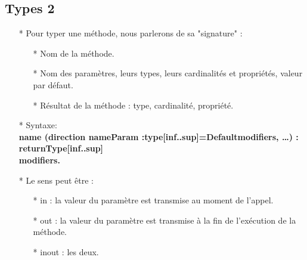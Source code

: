 \documentclass[12pt]{article}
\begin{document}
\subsection{Types 2}
\begin{itemize}
	\item[* ] Pour typer une méthode, nous parlerons de sa "signature" :
	\begin{itemize}
		\item[* ] Nom de la méthode.
		\item[* ] Nom des paramètres, leurs types, leurs cardinalités et propriétés, valeur par défaut.
		\item[* ] Résultat de la méthode : type, cardinalité, propriété.
	\end{itemize}
\item[* ] Syntaxe:\\
\textbf{name (direction nameParam :type[inf..sup]=Default{modifiers}, …) : returnType[inf..sup]\\{modifiers}.}
\item[*] Le sens peut être :
\begin{itemize}
	\item[* ] in : la valeur du paramètre est transmise au moment de l'appel.
	\item[* ] out : la valeur du paramètre est transmise à la fin de l'exécution de la
	méthode.
	\item[* ] inout : les deux.
\end{itemize}

\end{itemize}
\end{document}
